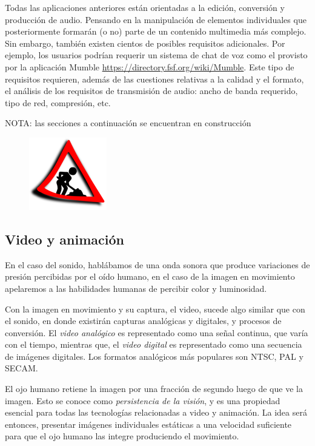 \documentclass[12pt]{article}
\begin{document}
Todas las aplicaciones anteriores están orientadas a la edición, conversión 
y producción de audio. Pensando en la manipulación de elementos individuales
que posteriormente formarán (o no) parte de un contenido multimedia más 
complejo. Sin embargo, también existen cientos de posibles requisitos adicionales.
Por ejemplo, los usuarios podrían requerir un sistema de chat de voz como 
el provisto por la aplicación Mumble \url{https://directory.fsf.org/wiki/Mumble}. 
Este tipo de requisitos requieren, además de las cuestiones relativas a la calidad
y el formato, el análisis de los requisitos de transmisión de audio: ancho de banda 
requerido, tipo de red, compresión, etc. 

\textcolor[rgb]{1,0,0}{NOTA: las secciones a continuación se encuentran en 
construcción}

\begin{figure}[h]
\centering
\includegraphics{UN_CONSTRUCTION_2ss.png}
\renewcommand{\figurename}{Fig.}
\label{contexto:figura}
\end{figure}

\subsection*{Video y animación}

En el caso del sonido, hablábamos de una onda sonora
que produce variaciones de presión percibidas por el oído humano, en el caso 
de la imagen en movimiento apelaremos a las habilidades humanas de 
percibir color y luminosidad.  

Con la imagen en movimiento y su captura, el video, sucede algo similar que con 
el sonido, en donde existirán capturas analógicas y digitales, y procesos 
de conversión. El {\it video analógico} es representado como una señal continua, que varía con 
el tiempo, mientras que, el {\it video digital} es representado como una secuencia 
de imágenes digitales. Los formatos analógicos más populares son NTSC, PAL y SECAM.  

El ojo humano retiene la imagen por una fracción de segundo luego de 
que ve la imagen. Esto se conoce como {\it persistencia de la visión}, y es 
una propiedad esencial para todas las tecnologías relacionadas a video y 
animación. La idea será entonces, presentar imágenes individuales estáticas
a una velocidad suficiente para que el ojo humano las integre produciendo 
el movimiento. 
\end{document}
